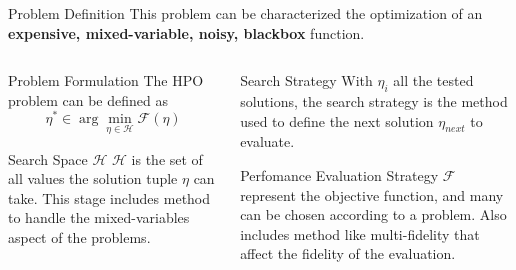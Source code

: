 \begin{frame}{Problem Definition}
    This problem can be characterized the optimization of an \textbf{expensive, mixed-variable, noisy, blackbox} function.

    \begin{columns}
    
        \begin{column}[t]{0.5\textwidth}
        \begin{block}{Problem Formulation}
            The HPO problem can be defined as 
            \begin{equation}
               \eta^* \in \arg\min_{\eta \in \mathcal{H}} \mathcal{F}(\eta) 
            \end{equation}

        \end{block}

        \begin{block}{Search Space $\mathcal{H}$}
            $\mathcal{H}$ is the set of all values the solution tuple $\eta$ can take. This stage includes method to handle the mixed-variables aspect of the problems.   
        \end{block}
        \end{column}
        
        \begin{column}[t]{0.5\textwidth}

    
        \begin{block}{Search Strategy}
            With $\eta_i$ all the tested solutions, the search strategy is the method used to define the next solution $\eta_{next}$ to evaluate. 
        \end{block}

        \begin{block}{Perfomance Evaluation Strategy}
            $\mathcal{F}$ represent the objective function, and many can be chosen according to a problem. Also includes method like multi-fidelity that affect the fidelity of the evaluation.
        \end{block}

        \end{column}
         
  \end{columns}
\end{frame}


